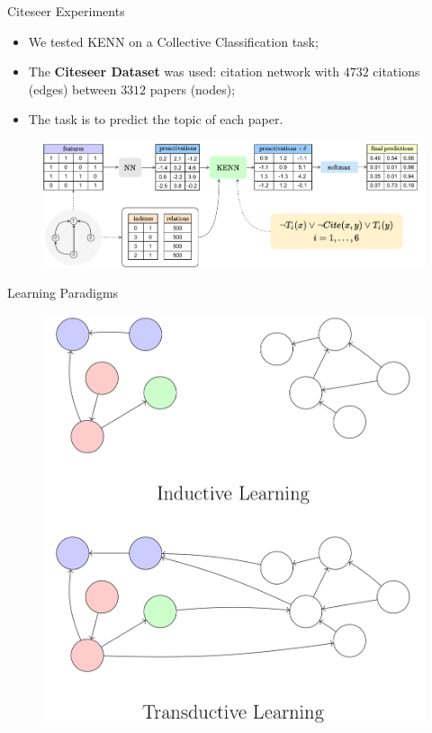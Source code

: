 \documentclass{beamer}
\begin{document}
\begin{frame}{Citeseer Experiments}
	\begin{itemize}
		\item We tested KENN on a Collective Classification task;
		\item The \textbf{Citeseer Dataset} was used: citation network with $4732$ citations (edges) between $3312$ papers (nodes);
		\item The task is to predict the topic of each paper.
	\end{itemize}

\begin{figure}
	\includegraphics[width=\linewidth]{images/citeseer_setup_pres.pdf}
\end{figure}
\end{frame}

\begin{frame}{Learning Paradigms}
	\begin{figure}
		\includegraphics[width=0.58\linewidth]{images/ind_vs_trans.png}
	\end{figure}
\end{frame}
\end{document}
